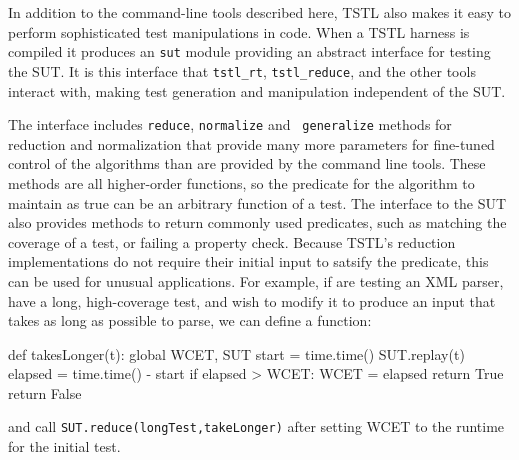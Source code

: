 In addition to the command-line tools described here, TSTL also makes
it easy to perform sophisticated test manipulations in code.  When a
TSTL harness is compiled it produces an {\tt sut} module providing an
abstract interface for testing the SUT.  It is this interface that
{\tt tstl\_rt}, {\tt tstl\_reduce}, and the other tools interact with,
making test generation and manipulation independent of the SUT.

The interface includes {\tt reduce}, {\tt normalize} and {\tt
  generalize} methods for reduction and normalization that provide
many more parameters for fine-tuned control of the algorithms than are
provided by the command line tools.  These methods are all
higher-order functions, so the predicate for the algorithm to maintain
as true can be an arbitrary function of a test.  The interface to the
SUT also provides methods to return commonly used predicates, such as
matching the coverage of a test, or failing a property check.  Because
TSTL's reduction implementations do not require their initial input to
satsify the predicate, this can be used for unusual applications.  For
example, if are testing an XML parser, have a long, high-coverage
test, and wish to modify it to produce an input that takes as long as
possible to parse, we can define a function:

{\scriptsize
\begin{code}
def takesLonger(t):
      global WCET, SUT
      start = time.time()
      SUT.replay(t)
      elapsed = time.time() - start
      if elapsed > WCET:
         WCET = elapsed
         return True
      return False
\end{code}
}

and call {\tt SUT.reduce(longTest,takeLonger)} after setting WCET to the
runtime for the initial test.